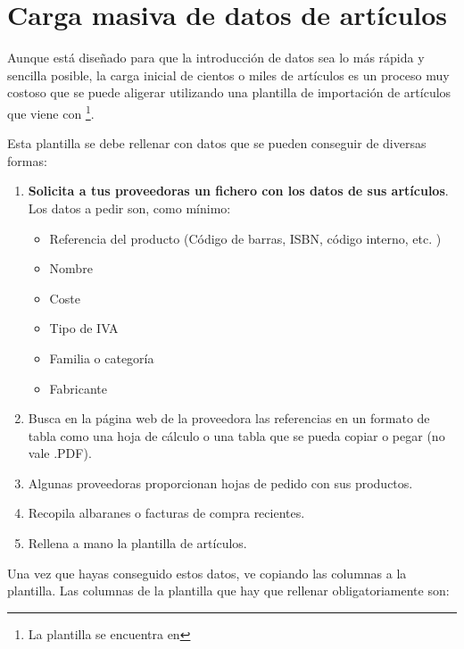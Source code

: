 \section{Carga masiva de datos de artículos}

Aunque \appname está diseñado para que la introducción de datos sea lo más rápida y sencilla posible, la carga inicial de cientos o miles de artículos es un proceso muy costoso que se puede aligerar utilizando una plantilla de importación de artículos que viene con \appname \footnote{La plantilla se encuentra en }.

Esta plantilla se debe rellenar con datos que se pueden conseguir de diversas formas:


\begin{enumerate}
 \item {\textbf{Solicita a tus proveedoras un fichero con los datos de sus artículos}. Los datos a pedir son, como mínimo:
 \begin{itemize}
  \item Referencia del producto (Código de barras, ISBN, código interno, etc. )
  \item Nombre 
  \item Coste
  \item Tipo de IVA
  \item Familia o categoría
  \item Fabricante
 \end{itemize}
 }
 \item {Busca en la página web de la proveedora las referencias en un formato de tabla como una hoja de cálculo o una tabla que se pueda copiar o pegar (no vale .PDF).}
 \item {Algunas proveedoras proporcionan hojas de pedido con sus productos.}
 \item {Recopila albaranes o facturas de compra recientes}.
 \item {Rellena a mano la plantilla de artículos}.
\end{enumerate}

Una vez que hayas conseguido estos datos, ve copiando las columnas a la plantilla. Las columnas de la plantilla que hay que rellenar obligatoriamente son:

